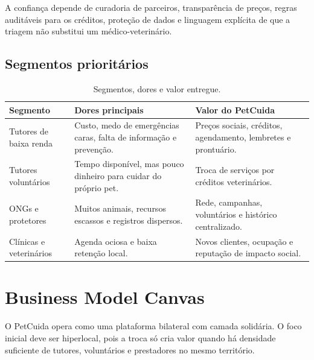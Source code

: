 \documentclass[12pt,a4paper]{article}
\begin{document}
A confiança depende de curadoria de parceiros, transparência de preços, regras auditáveis para os créditos, proteção de dados e linguagem explícita de que a triagem não substitui um médico-veterinário.

\subsection{Segmentos prioritários}
\begin{table}[H]
\centering
\caption{Segmentos, dores e valor entregue.}
\begin{tabularx}{\textwidth}{p{3.1cm}p{4.0cm}Y}
\toprule
\textbf{Segmento} & \textbf{Dores principais} & \textbf{Valor do PetCuida}\\
\midrule
Tutores de baixa renda & Custo, medo de emergências caras, falta de informação e prevenção. & Preços sociais, créditos, agendamento, lembretes e prontuário.\\
Tutores voluntários & Tempo disponível, mas pouco dinheiro para cuidar do próprio pet. & Troca de serviços por créditos veterinários.\\
ONGs e protetores & Muitos animais, recursos escassos e registros dispersos. & Rede, campanhas, voluntários e histórico centralizado.\\
Clínicas e veterinários & Agenda ociosa e baixa retenção local. & Novos clientes, ocupação e reputação de impacto social.\\
\bottomrule
\end{tabularx}
\end{table}

\section{Business Model Canvas}
O PetCuida opera como uma plataforma bilateral com camada solidária. O foco inicial deve ser hiperlocal, pois a troca só cria valor quando há densidade suficiente de tutores, voluntários e prestadores no mesmo território.
\end{document}
